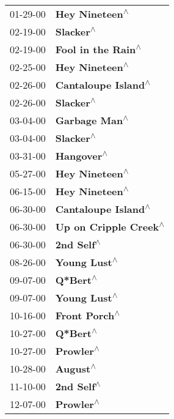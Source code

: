 \begin{supertabular}{p{0.25\columnwidth}p{0.75\columnwidth}}
 01-29-00 &         \textbf{Hey Nineteen\textsuperscript{$\wedge$}} \\
 02-19-00 &              \textbf{Slacker\textsuperscript{$\wedge$}} \\
 02-19-00 &     \textbf{Fool in the Rain\textsuperscript{$\wedge$}} \\
 02-25-00 &         \textbf{Hey Nineteen\textsuperscript{$\wedge$}} \\
 02-26-00 &    \textbf{Cantaloupe Island\textsuperscript{$\wedge$}} \\
 02-26-00 &              \textbf{Slacker\textsuperscript{$\wedge$}} \\
 03-04-00 &          \textbf{Garbage Man\textsuperscript{$\wedge$}} \\
 03-04-00 &              \textbf{Slacker\textsuperscript{$\wedge$}} \\
 03-31-00 &             \textbf{Hangover\textsuperscript{$\wedge$}} \\
 05-27-00 &         \textbf{Hey Nineteen\textsuperscript{$\wedge$}} \\
 06-15-00 &         \textbf{Hey Nineteen\textsuperscript{$\wedge$}} \\
 06-30-00 &    \textbf{Cantaloupe Island\textsuperscript{$\wedge$}} \\
 06-30-00 &  \textbf{Up on Cripple Creek\textsuperscript{$\wedge$}} \\
 06-30-00 &             \textbf{2nd Self\textsuperscript{$\wedge$}} \\
 08-26-00 &           \textbf{Young Lust\textsuperscript{$\wedge$}} \\
 09-07-00 &               \textbf{Q*Bert\textsuperscript{$\wedge$}} \\
 09-07-00 &           \textbf{Young Lust\textsuperscript{$\wedge$}} \\
 10-16-00 &          \textbf{Front Porch\textsuperscript{$\wedge$}} \\
 10-27-00 &               \textbf{Q*Bert\textsuperscript{$\wedge$}} \\
 10-27-00 &              \textbf{Prowler\textsuperscript{$\wedge$}} \\
 10-28-00 &               \textbf{August\textsuperscript{$\wedge$}} \\
 11-10-00 &             \textbf{2nd Self\textsuperscript{$\wedge$}} \\
 12-07-00 &              \textbf{Prowler\textsuperscript{$\wedge$}} \\
\end{supertabular}
